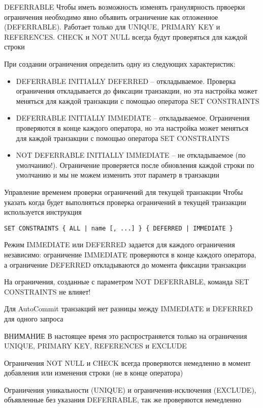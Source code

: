 \documentclass[12pt]{article}
\begin{document}
\begin{nota}{DEFERRABLE}
    Чтобы иметь возможность изменять гранулярность првоерки ограничения необходимо явно объявить ограничение как отложенное (DEFERRABLE). Работает только для UNIQUE, PRIMARY KEY и REFERENCES. CHECK и NOT NULL всегда будут проверяться для каждой строки 

    При создании ограничения определить одну из следующих характеристик:

    \begin{itemize}
        \item DEFERRABLE INITIALLY DEFERRED -- откладываемое. Проверка ограничения откладывается до фиксации транзакции, но эта настройка может меняться для каждой транзакции с помощью оператора SET CONSTRAINTS
        \item DEFERRABLE INITIALLY IMMEDIATE -- откладываемое. Ограничения проверяются в конце каждого оператора, но эта настройка может меняться для каждой транзакции с помощью оператора SET CONSTRAINTS
        \item NOT DEFERRABLE INITIALLY IMMEDIATE -- не откладываемое (по умолчанию!). Ограничение проверяется после обновления каждой строки по умолчанию и мы не можем изменить этот параметр в транзакции 
    \end{itemize}
\end{nota}

\begin{nota}{Управление временем проверки ограничений для текущей транзакции}
    Чтобы указать когда будет выполняться проверка ограничений в текущей транзакции используется инструкция 

\begin{lstlisting}
SET CONSTRAINTS { ALL | name [, ...] } { DEFERRED | IMMEDIATE }
\end{lstlisting}

    Режим IMMEDIATE или DEFERRED задается для каждого ограничения независимо: ограничение IMMEDIATE проверяются в конце каждого оператора, а ограничение DEFERRED откладываются до момента фиксации транзакции

    На ограничения, созданные с параметром NOT DEFERRABLE, команда SET CONSTRAINTS не влияет!

    Для AutoCommit транзакций нет разницы между IMMEDIATE и DEFERRED для одного запроса 
\end{nota}

\begin{Remark}{ВНИМАНИЕ}
    В настоящее время это распространяется только на ограничения UNIQUE, PRIMARY KEY, REFERENCES и EXCLUDE 

    Ограничения NOT NULL и CHECK всегда проверяются немедленно в момент добавления или изменения строки (не в конце оператора)

    Ограничения уникальности (UNIQUE) и ограничения-исключения (EXCLUDE), объявленные без указания DEFERRABLE, так же проверяются немедленно 
\end{Remark}
\end{document}

